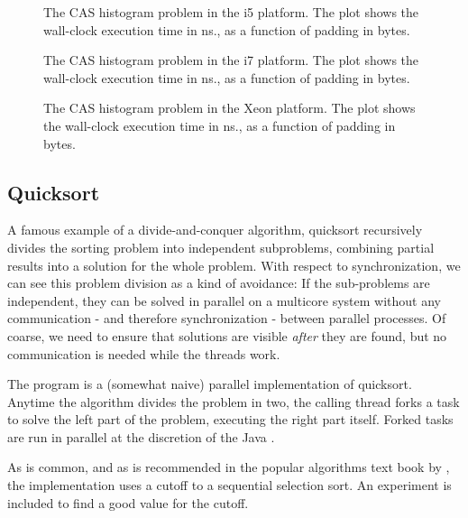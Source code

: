 
\begin{figure}[hbpt]
\graphicspath{{plots/}}

\caption{The CAS histogram problem in the i5 platform. The plot shows the
	wall-clock execution time in ns., as a function of padding in bytes.}
\label{fig:histo-cas-i5}
\end{figure}

\begin{figure}[hbpt]
\graphicspath{{plots/}}

\caption{The CAS histogram problem in the i7 platform. The plot shows the
	wall-clock execution time in ns., as a function of padding in bytes.}
	\label{fig:histo-cas-i7}
\end{figure}

\begin{figure}[hbpt]
\graphicspath{{plots/}}

\caption{The CAS histogram problem in the Xeon platform. The plot shows the
	wall-clock execution time in ns., as a function of padding in bytes.}
	\label{fig:histo-cas-xeon}
\end{figure}

\subsection{Quicksort}
A famous example of a divide-and-conquer algorithm, quicksort recursively
divides the sorting problem into independent subproblems, combining partial
results into a solution for the whole problem. With respect to synchronization,
we can see this problem division as a kind of avoidance: If the sub-problems are
independent, they can be solved in parallel on a multicore system without any
communication - and therefore synchronization - between parallel processes.
Of coarse, we need to ensure that solutions are visible \textit{after} they are
found, but no communication is needed while the threads work.


The program is a (somewhat naive) parallel implementation of quicksort. Anytime
the algorithm divides the problem in two, the calling thread forks a task to
solve the left part of the problem, executing the right part itself. Forked
tasks are run in parallel at the discretion of the Java .

As is common, and as is recommended in the popular algorithms text book by
\citet{sedgewick}, the implementation uses a cutoff to a sequential selection
sort. An experiment is included to find a good value for the cutoff.

